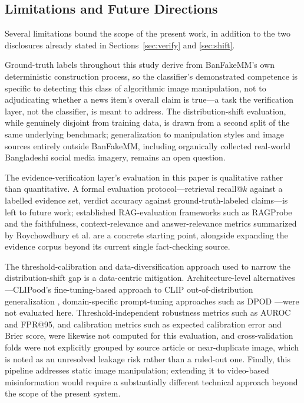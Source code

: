 \documentclass[conference,a4paper]{IEEEtran}
\begin{document}
\subsection{Limitations and Future Directions}
\label{sec:limitations}

Several limitations bound the scope of the present work, in addition to the
two disclosures already stated in Sections~\ref{sec:verify} and
\ref{sec:shift}.

Ground-truth labels throughout this study derive from BanFakeMM's own
deterministic construction process, so the classifier's demonstrated
competence is specific to detecting this class of algorithmic image
manipulation, not to adjudicating whether a news item's overall claim is
true---a task the verification layer, not the classifier, is meant to address.
The distribution-shift evaluation, while genuinely disjoint from training
data, is drawn from a second split of the same underlying benchmark;
generalization to manipulation styles and image sources entirely outside
BanFakeMM, including organically collected real-world Bangladeshi social media
imagery, remains an open question.

The evidence-verification layer's evaluation in this paper is qualitative
rather than quantitative. A formal evaluation protocol---retrieval recall@$k$
against a labelled evidence set, verdict accuracy against ground-truth-labeled
claims---is left to future work; established RAG-evaluation frameworks such as
RAGProbe \cite{ragprobe} and the faithfulness, context-relevance and
answer-relevance metrics summarized by Roychowdhury et al. \cite{ragmetrics}
are a concrete starting point, alongside expanding the evidence corpus beyond
its current single fact-checking source.

The threshold-calibration and data-diversification approach used to narrow the
distribution-shift gap is a data-centric mitigation. Architecture-level
alternatives---CLIPood's fine-tuning-based approach to CLIP out-of-distribution
generalization \cite{clipood}, domain-specific prompt-tuning approaches such as
DPOD \cite{dpod}---were not evaluated here. Threshold-independent robustness
metrics such as AUROC and FPR@95, and calibration metrics such as expected
calibration error and Brier score, were likewise not computed for this
evaluation, and cross-validation folds were not explicitly grouped by source
article or near-duplicate image, which is noted as an unresolved leakage risk
rather than a ruled-out one. Finally, this pipeline addresses static image
manipulation; extending it to video-based misinformation would require a
substantially different technical approach beyond the scope of the present
system.
\end{document}
